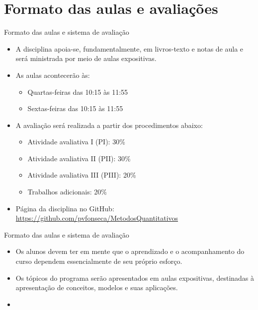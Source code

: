 \documentclass[10pt]{beamer}
\begin{document}
\section{Formato das aulas e avaliações}
\begin{frame}{Formato das aulas e sistema de avaliação}
    \begin{itemize}
        \item A disciplina apoia-se, fundamentalmente, em livros-texto e notas de aula e será ministrada por meio de aulas expositivas.\bigskip

        \item As aulas acontecerão às:
              \begin{itemize}
                  \item Quartas-feiras das 10:15 às 11:55
                  \item Sextas-feiras das 10:15 às 11:55\bigskip
              \end{itemize}

        \item A avaliação será realizada a partir dos procedimentos abaixo:
              \begin{itemize}
                  \item Atividade avaliativa I (PI): 30\%
                  \item Atividade avaliativa II (PII): 30\%
                  \item Atividade avaliativa III (PIII): 20\%
                  \item Trabalhos adicionais: 20\%\bigskip
              \end{itemize}

        \item Página da disciplina no GitHub: \href{github.com/pvfonseca/MetodosQuantitativos}{https://github.com/pvfonseca/MetodosQuantitativos}
    \end{itemize}
\end{frame}

\begin{frame}{Formato das aulas e sistema de avaliação}
    \begin{itemize}
        \item Os alunos devem ter em mente que o aprendizado e o acompanhamento do curso dependem essencialmente de seu próprio esforço.\bigskip

        \item Os tópicos do programa serão apresentados em aulas expositivas, destinadas à apresentação de conceitos, modelos e suas aplicações.\bigskip

        \item {}
    \end{itemize}

\end{frame}
\end{document}
